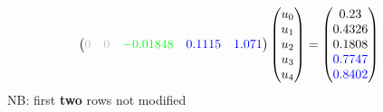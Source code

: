 \documentclass{beamer}
\begin{document}
\begin{frame}[fragile]
$${\begin{aligned}
\begin{pmatrix}
\textcolor{lightgray}{0} & \textcolor{lightgray}{0} & \textcolor{green}{-0.01848} & \textcolor{blue}{0.1115} & \textcolor{blue}{1.071}
\end{pmatrix}
\begin{pmatrix}
u_0 \\ u_1 \\ u_2 \\ u_3 \\ u_4
\end{pmatrix}
&=
    \begin{pmatrix}
0.23\\
0.4326\\
\textcolor{black}{0.1808}\\
\textcolor{blue}{0.7747}\\
\textcolor{blue}{0.8402}
\end{pmatrix}
\end{aligned}}
$$
NB: first \textbf{two} rows not modified
\end{frame}

\end{document}
